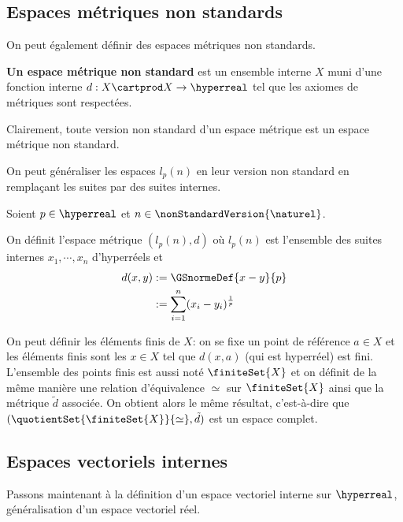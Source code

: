 \subsection{Espaces métriques non standards}

On peut également définir des espaces métriques non standards.
\begin{definition}
	\textbf{Un espace métrique non standard} est un ensemble interne $X$ muni
		d'une fonction interne $d : X \cartprod X \rightarrow \hyperreal$ tel
		que les axiomes de métriques sont respectées.
\end{definition}

Clairement, toute version non standard d'un espace métrique est un espace
métrique non standard.

On
peut généraliser les espaces $l_{p}(n)$ en leur version non standard en
remplaçant les suites par des suites internes.

Soient $p \in \hyperreal$ et $n \in \nonStandardVersion{\naturel}$.

On définit l'espace métrique $(l_{p}(n), d)$ où $l_{p}(n)$ est l'ensemble des
suites internes $x_{1}, \cdots, x_{n}$ d'hyperréels et
\begin{align} d(x, y) &
	:= \GSnormeDef{x - y}{p} \\ & := \sum_{i = 1}^{n}(x_{i} -
	y_{i})^{\frac{1}{p}}
\end{align}

On peut définir les éléments finis de $X$: on se fixe un point de référence $a
\in X$ et les éléments finis sont les $x \in X$ tel que $d(x, a)$ (qui est
hyperréel) est fini. L'ensemble des points finis est aussi noté $\finiteSet{X}$
et on définit de la même manière une relation d'équivalence $\simeq$ sur
$\finiteSet{X}$ ainsi que la métrique $\tilde{d}$ associée.
On obtient alors le même résultat, c'est-à-dire que
$(\quotientSet{\finiteSet{X}}{\simeq}, \tilde{d})$ est un espace complet.

\subsection{Espaces vectoriels internes}

Passons maintenant à la définition d'un espace vectoriel interne sur
$\hyperreal$, généralisation d'un espace vectoriel réel.

